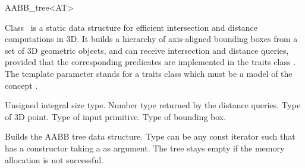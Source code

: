 \ccRefPageBegin


\begin{ccRefClass}{AABB_tree<AT>}  %


\ccDefinition
  
Class \ccRefName\ is a static data structure for efficient intersection and distance computations in 3D. It builds a hierarchy of axis-aligned bounding boxes from a set of 3D geometric objects, and can receive intersection and distance queries, provided that the corresponding predicates are implemented in the traits class . The template parameter  stands for a traits class which must be a model of the concept .


\ccTypes

          {Unsigned integral size type.}
\ccGlue
{}
          {Number type returned by the distance queries.}
\ccGlue
{}
          {Type of 3D point.}
\ccGlue
{}
          {Type of input primitive.}
\ccGlue
{}
          {Type of bounding box.}
\ccGlue
{}
          {}
\ccGlue
{}
          {}


\ccCreation
{} %

{Builds the AABB tree data structure. Type  can be any const iterator such that  has a constructor taking a  as argument. The tree stays empty if the memory allocation is not successful.}


\end{ccRefClass}
